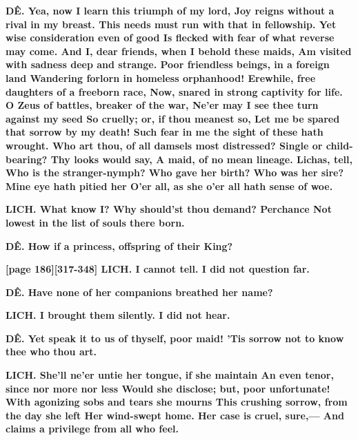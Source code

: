 \documentclass[11pt,letter]{book}
\begin{document}
\par \textbf{DÊ. Yea, now I learn this triumph of my lord, Joy reigns without a rival in my breast. This needs must run with that in fellowship. Yet wise consideration even of good Is flecked with fear of what reverse may come. And I, dear friends, when I behold these maids, Am visited with sadness deep and strange. Poor friendless beings, in a foreign land Wandering forlorn in homeless orphanhood! Erewhile, free daughters of a freeborn race, Now, snared in strong captivity for life. O Zeus of battles, breaker of the war, Ne’er may I see thee turn against my seed So cruelly; or, if thou meanest so, Let me be spared that sorrow by my death! Such fear in me the sight of these hath wrought. Who art thou, of all damsels most distressed? Single or child-bearing? Thy looks would say, A maid, of no mean lineage. Lichas, tell, Who is the stranger-nymph? Who gave her birth? Who was her sire? Mine eye hath pitied her O’er all, as she o’er all hath sense of woe.}
\par 

\par \textbf{LICH. What know I? Why should’st thou demand? Perchance Not lowest in the list of souls there born.}
\par 

\par \textbf{DÊ. How if a princess, offspring of their King?}
\par 

\par \textbf{[page 186][317-348] LICH. I cannot tell. I did not question far.}
\par 

\par \textbf{DÊ. Have none of her companions breathed her name?}
\par 

\par \textbf{LICH. I brought them silently. I did not hear.}
\par 

\par \textbf{DÊ. Yet speak it to us of thyself, poor maid! ’Tis sorrow not to know thee who thou art.}
\par 

\par \textbf{LICH. She’ll ne’er untie her tongue, if she maintain An even tenor, since nor more nor less Would she disclose; but, poor unfortunate! With agonizing sobs and tears she mourns This crushing sorrow, from the day she left Her wind-swept home. Her case is cruel, sure,— And claims a privilege from all who feel.}
\par 
\end{document}
